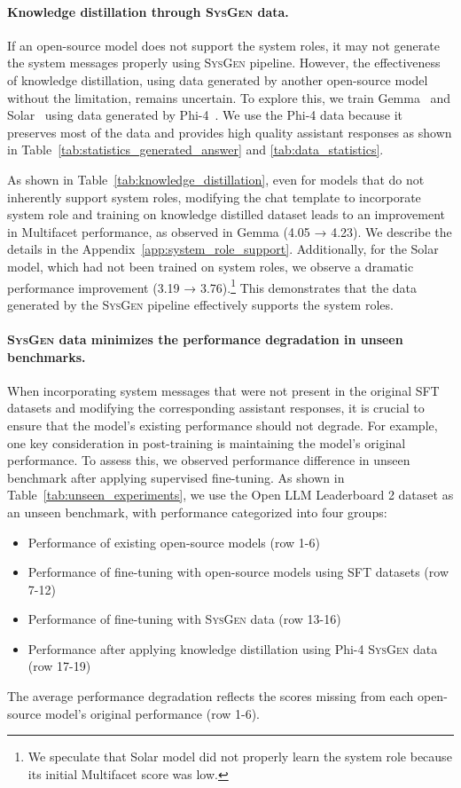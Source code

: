 \paragraph{Knowledge distillation through \textsc{SysGen} data.}
If an open-source model does not support the system roles, it may not generate the system messages properly using \textsc{SysGen} pipeline. 
However, the effectiveness of knowledge distillation, using data generated by another open-source model without the limitation, remains uncertain.
To explore this, we train Gemma~\citep{team2024gemma} and Solar~\citep{kim-etal-2024-solar} using data generated by Phi-4~\citep{abdin2024phi}.
We use the Phi-4 data because it preserves most of the data and provides high quality  assistant responses as shown in Table~\ref{tab:statistics_generated_answer} and \ref{tab:data_statistics}.

As shown in Table~\ref{tab:knowledge_distillation}, even for models that do not inherently support system roles, modifying the chat template to incorporate system role and training on knowledge distilled dataset leads to an improvement in Multifacet performance, as observed in Gemma (4.05 → 4.23).
We describe the details in the Appendix~\ref{app:system_role_support}.
Additionally, for the Solar model, which had not been trained on system roles, we observe a dramatic performance improvement (3.19 → 3.76).\footnote{We speculate that Solar model did not properly learn the system role because its initial Multifacet score was low.}
This demonstrates that the data generated by the \textsc{SysGen} pipeline effectively supports the system roles.


\paragraph{\textsc{SysGen} data minimizes the performance degradation in unseen benchmarks.}
When incorporating system messages that were not present in the original SFT datasets and modifying the corresponding assistant responses, it is crucial to ensure that the model’s existing performance should not degrade.
For example, one key consideration in post-training is maintaining the model's original performance.
To assess this, we observed performance difference in unseen benchmark after applying supervised fine-tuning.
As shown in Table~\ref{tab:unseen_experiments}, we use the Open LLM Leaderboard 2 dataset as an unseen benchmark, with performance categorized into four groups:
\begin{itemize}
    \item Performance of existing open-source models (row 1-6)
    \item Performance of fine-tuning with open-source models using SFT datasets (row 7-12)
    \item Performance of fine-tuning with \textsc{SysGen} data (row 13-16)
    \item Performance after applying knowledge distillation using Phi-4 \textsc{SysGen} data (row 17-19)
\end{itemize}
The average performance degradation reflects the scores missing from each open-source model's original performance (row 1-6).

